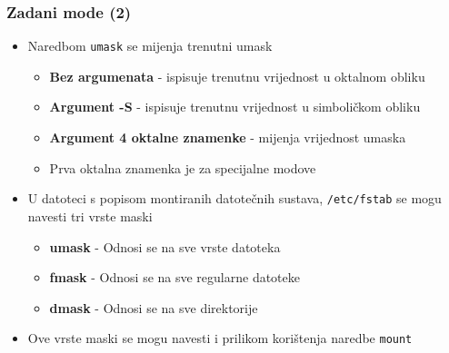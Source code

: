 \documentclass[table,usenames,dvipsnames]{beamer}
\newcommand{\shell}[1]{\texttt{#1}}
\begin{document}
\begin{frame}[t]
	\frametitle{Zadani mode (2)}
\begin{itemize}
	\item Naredbom \shell{umask} se mijenja trenutni umask
	\begin{itemize}
		\item \textbf{Bez argumenata} - ispisuje trenutnu vrijednost u oktalnom obliku
		\item \textbf{Argument -S} - ispisuje trenutnu vrijednost u simboličkom obliku
		\item \textbf{Argument 4 oktalne znamenke} - mijenja vrijednost umaska
		\item[] \hspace{1em} Prva oktalna znamenka je za specijalne modove
	\end{itemize}
\end{itemize}
\begin{itemize}
	\item U datoteci s popisom montiranih datotečnih sustava, \shell{/etc/fstab} se mogu navesti tri vrste maski
	\begin{itemize}
		\item \textbf{umask} - Odnosi se na sve vrste datoteka
		\item \textbf{fmask} - Odnosi se na sve regularne datoteke
		\item \textbf{dmask} - Odnosi se na sve direktorije
	\end{itemize}
	\item Ove vrste maski se mogu navesti i prilikom korištenja naredbe \shell{mount}
\end{itemize}
\end{frame}
  
\end{document}

